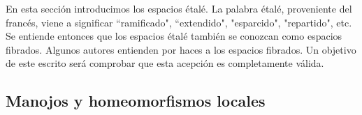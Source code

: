 En esta sección introducimos los espacios étalé. La palabra étalé, proveniente del francés, viene a significar ``ramificado", ``extendido", "esparcido", "repartido", etc. Se entiende entonces que los espacios étalé también se conozcan como espacios fibrados. Algunos autores entienden por haces a los espacios fibrados. Un objetivo de este escrito será comprobar que esta acepción es completamente válida.
\subsection{Manojos y homeomorfismos locales}
   
